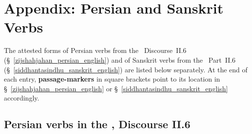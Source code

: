 \appendix
\renewcommand{\thesubsection}{A.\arabic{subsection}}
\OnehalfSpacing

\section*{Appendix: Persian and Sanskrit Verbs}\label{Appendix_verbs}

The attested forms of Persian verbs from the \ZijiShahJahani\ Discourse~II.6 (\S~\ref{zijshahjahan_persian_english}) and of Sanskrit verbs from the \Siddhantasindhu\ Part~II.6 (\S~\ref{siddhantasindhu_sanskrit_english}) are listed below separately. At the end of each entry, \textbf{passage-markers} in square brackets point to its location in \S~\ref{zijshahjahan_persian_english} or \S~\ref{siddhantasindhu_sanskrit_english} accordingly.

\subsection{Persian verbs in the \ZijiShahJahani, Discourse II.6} \label{persian_verbs}

